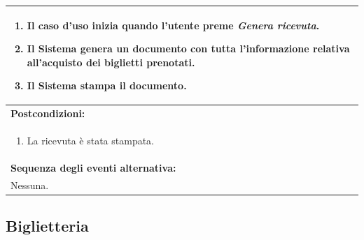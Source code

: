 \documentclass{article}
\begin{document}
\begin{table}[H]
\begin{tabular}{|p{\linewidth}|}
\begin{enumerate}
                            \item Il caso d'uso inizia quando l'utente preme \emph{Genera ricevuta}.
                            \item Il Sistema genera un documento con tutta l'informazione relativa all'acquisto dei biglietti prenotati.
                            \item Il Sistema stampa il documento.
                        \end{enumerate} \\
                        \hline
                        \cellcolor{gray!20}
                        \textbf{Postcondizioni:} \\
                        \cellcolor{gray!20}
                        \begin{minipage}{\linewidth}
                            \begin{enumerate}
                                \item La ricevuta è stata stampata.
                            \end{enumerate}
                        \end{minipage} \\
                        \hline
                        \textbf{Sequenza degli eventi alternativa:} \\
                        Nessuna. \\
                        \hline
                    \end{tabular}
                \end{table}

        \subsection{Biglietteria}
\end{document}
